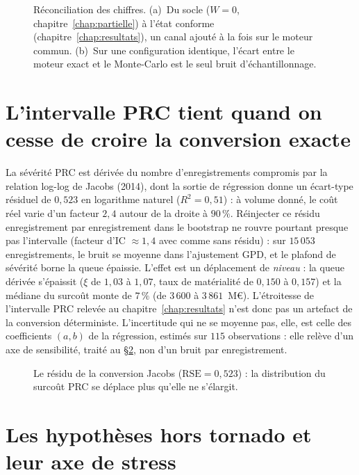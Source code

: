 \begin{figure}[htbp]\centering
{}
\caption{Réconciliation des chiffres. (a)~Du socle ($W=0$, chapitre~\ref{chap:partielle}) à
l'état conforme (chapitre~\ref{chap:resultats}), un canal ajouté à la fois sur le moteur
commun. (b)~Sur une configuration identique, l'écart entre le moteur exact et le Monte-Carlo
est le seul bruit d'échantillonnage.}
\label{fig:reconciliation}
\end{figure}

\section{L'intervalle PRC tient quand on cesse de croire la conversion exacte}
\label{sec:ann-jacobs}

La sévérité PRC est dérivée du nombre d'enregistrements compromis par la relation log-log de
Jacobs (2014), dont la sortie de régression donne un écart-type résiduel de $0{,}523$ en
logarithme naturel ($R^2 = 0{,}51$) : à volume donné, le coût réel varie d'un facteur $2{,}4$
autour de la droite à $90\,\%$. Réinjecter ce résidu enregistrement par enregistrement dans le
bootstrap ne rouvre pourtant presque pas l'intervalle (facteur d'IC $\approx 1{,}4$ avec comme
sans résidu) : sur $15\,053$ enregistrements, le bruit se moyenne dans l'ajustement GPD, et le
plafond de sévérité borne la queue épaissie. L'effet est un déplacement de \emph{niveau} : la
queue dérivée s'épaissit ($\xi$ de $1{,}03$ à $1{,}07$, taux de matérialité de $0{,}150$ à
$0{,}157$) et la médiane du surcoût monte de $7\,\%$ (de $3\,600$ à $3\,861$~M\euro).
L'étroitesse de l'intervalle PRC relevée au chapitre~\ref{chap:resultats} n'est donc pas un
artefact de la conversion déterministe. L'incertitude qui ne se moyenne pas, elle, est celle
des coefficients $(a,b)$ de la régression, estimés sur $115$ observations : elle relève d'un
axe de sensibilité, traité au \S\ref{sec:ann-hypotheses}, non d'un bruit par enregistrement.

\begin{figure}[htbp]\centering
{}
\caption{Le résidu de la conversion Jacobs ($\mathrm{RSE} = 0{,}523$) : la distribution du
surcoût PRC se déplace plus qu'elle ne s'élargit.}
\label{fig:jacobsresidu}
\end{figure}

\section{Les hypothèses hors tornado et leur axe de stress}
\label{sec:ann-hypotheses}


